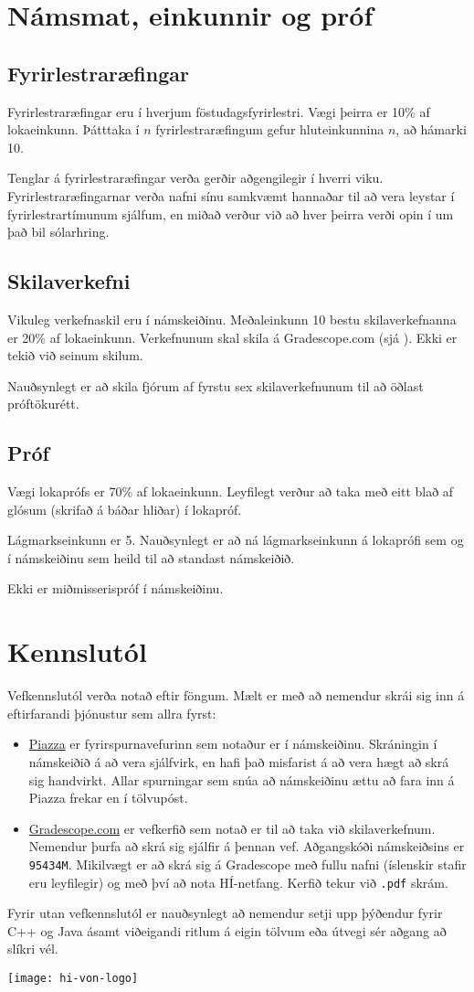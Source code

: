 \documentclass{article}
\begin{document}
\newpage
\section{Námsmat, einkunnir og próf}
\subsection{Fyrirlestraræfingar}
\label{sec:lecture-exercises}
Fyrirlestraræfingar eru í hverjum föstudagsfyrirlestri. Vægi þeirra er 10\% af lokaeinkunn. Þátttaka í $n$ fyrirlestraræfingum gefur hluteinkunnina $n$, að hámarki 10.

Tenglar á fyrirlestraræfingar verða gerðir aðgengilegir í hverri viku. Fyrirlestraræfingarnar verða nafni sínu samkvæmt hannaðar til að vera leystar í fyrirlestrartímunum sjálfum, en miðað verður við að hver þeirra verði opin í um það bil sólarhring.
\subsection{Skilaverkefni}
Vikuleg verkefnaskil eru í námskeiðinu. Meðaleinkunn 10 bestu skilaverkefnanna er 20\% af lokaeinkunn. Verkefnunum skal skila á Gradescope.com (sjá ). Ekki er tekið við seinum skilum.

Nauðsynlegt er að skila fjórum af fyrstu sex skilaverkefnunum til að öðlast próftökurétt.
\subsection{Próf}
Vægi lokaprófs er 70\% af lokaeinkunn. Leyfilegt verður að taka með eitt blað af glósum (skrifað á báðar hliðar) í lokapróf.

Lágmarkseinkunn er 5. Nauðsynlegt er að ná lágmarkseinkunn á lokaprófi sem og í námskeiðinu sem heild til að standast námskeiðið. 

Ekki er miðmisserispróf í námskeiðinu.
\section{Kennslutól}
\label{sec:tools}
Vefkennslutól verða notað eftir föngum. Mælt er með að nemendur skrái sig inn á eftirfarandi þjónustur sem allra fyrst:
\begin{itemize}
 \item \href{https://piazza.com/hi.is/spring2017/tl203g/home}{Piazza} er fyrirspurnavefurinn sem notaður er í námskeiðinu. Skráningin í námskeiðið á að vera sjálfvirk, en hafi það misfarist á að vera hægt að skrá sig handvirkt. Allar spurningar sem snúa að námskeiðinu ættu að fara inn á Piazza frekar en í tölvupóst.
 \item \href{https://gradescope.com/courses/5640}{Gradescope.com} er vefkerfið sem notað er til að taka við skilaverkefnum. Nemendur þurfa að skrá sig sjálfir á þennan vef. Aðgangskóði námskeiðsins er \texttt{95434M}. Mikilvægt er að skrá sig á Gradescope með fullu nafni (íslenskir stafir eru leyfilegir) og með því að nota HÍ-netfang. Kerfið tekur við \texttt{.pdf} skrám.
\end{itemize}
Fyrir utan vefkennslutól er nauðsynlegt að nemendur setji upp þýðendur fyrir C++ og Java ásamt viðeigandi ritlum á eigin tölvum eða útvegi sér aðgang að slíkri vél.

\vfill
\texttt{[image: hi-von-logo]}
\end{document}
